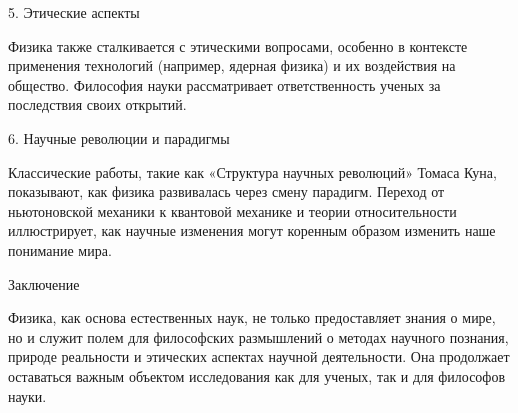 \documentclass[exam_answers.tex]{subfiles}
\begin{document}
5. Этические аспекты

Физика также сталкивается с этическими вопросами, особенно в контексте применения технологий (например, ядерная физика) и их воздействия на общество.
Философия науки рассматривает ответственность ученых за последствия своих открытий.

6. Научные революции и парадигмы

Классические работы, такие как «Структура научных революций» Томаса Куна, показывают, как физика развивалась через смену парадигм.
Переход от ньютоновской механики к квантовой механике и теории относительности иллюстрирует, как научные изменения могут коренным образом изменить наше понимание мира.

Заключение

Физика, как основа естественных наук, не только предоставляет знания о мире, но и служит полем для философских размышлений о методах научного познания, природе реальности и этических аспектах научной деятельности. Она продолжает оставаться важным объектом исследования как для ученых, так и для философов науки.
\end{document}
